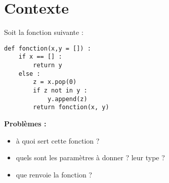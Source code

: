 \def\xxactivite{Cours}

\def\xxauteur{Xavier Pessoles}
\fichefalse \proftrue \tdfalse \courstrue

\def\xxnumchapitre{Chapitre 5 \vspace{.2cm}}
\def\xxchapitre{\hspace{.12cm} Méthode de programmation}

\def\xxcompetences{%
\textsl{%
\textbf{Savoirs et compétences :}\\
\begin{itemize}[label=\ding{112},font=\color{bleuxp}] 
\item Spécifications des données attentdues en entrée et fournie en sortie/retour.
\item Annotation d'un bloc d'instructions par une précondition, une postcondition, une propriété invariante
\item Assertion.
\item Jeu de tests associé à un programme.
\end{itemize}
}}

\def\xxfigures{
}%


\setlength{\columnseprule}{.1pt}

\vspace{2cm}
\pagestyle{fancy}
\thispagestyle{plain}




\section{Contexte}
Soit la fonction suivante : 
\begin{lstlisting}
def fonction(x,y = []) :
    if x == [] : 
        return y
    else : 
        z = x.pop(0)
        if z not in y : 
            y.append(z)
        return fonction(x, y)
\end{lstlisting}

\textbf{Problèmes :}
\begin{itemize}
\item à quoi sert cette fonction ?
\item quels sont les paramètres à donner ? leur type ?
\item que renvoie la fonction ?
\end{itemize}

